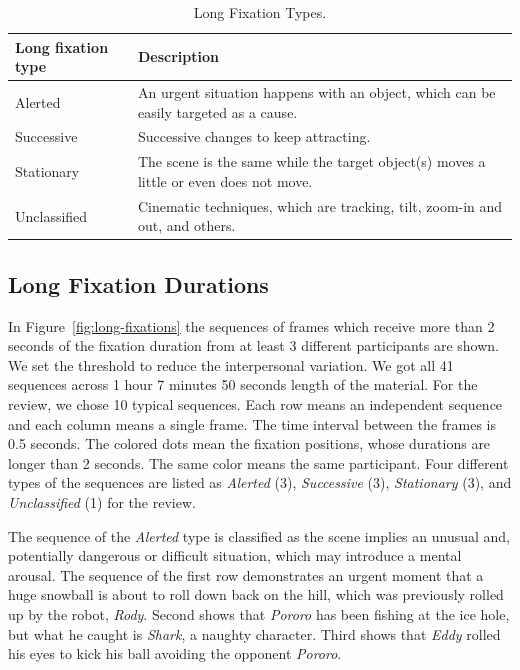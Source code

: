 \documentclass[10pt,letterpaper]{article}
\begin{document}
\begin{table}[!ht]
\begin{center} 
\caption{Long Fixation Types.} 
\label{tab:long-fixation-types} 
\vskip 0.12in
\begin{tabular}{ll} 
\hline
Long fixation type    &  Description \\
\hline
Alerted         &   An urgent situation happens with an object, 
                      which can be easily targeted as a cause. \\
Successive      &   Successive changes to keep attracting. \\
Stationary      &   The scene is the same while the target object(s)
                      moves a little or even does not move. \\
Unclassified    &   Cinematic techniques, which are tracking, tilt, 
                      zoom-in and out, and others. \\
\hline
\end{tabular} 
\end{center} 
\end{table}


\subsection{Long Fixation Durations}
\label{subsec:Long-Fixation-Durations}

In Figure~\ref{fig:long-fixations} the sequences of frames which receive more than 2 seconds of the fixation duration from at least 3 different participants are shown. We set the threshold to reduce the interpersonal variation. We got all 41 sequences across 1 hour 7 minutes 50 seconds length of the material. For the review, we chose 10 typical sequences. Each row means an independent sequence and each column means a single frame. The time interval between the frames is 0.5 seconds. The colored dots mean the fixation positions, whose durations are longer than 2 seconds. The same color means the same participant. Four different types of the sequences are listed as \textit{Alerted} (3), \textit{Successive} (3), \textit{Stationary} (3), and \textit{Unclassified} (1) for the review.

The sequence of the \textit{Alerted} type is classified as the scene implies an unusual and, potentially dangerous or difficult situation, which may introduce a mental arousal. The sequence of the first row demonstrates an urgent moment that a huge snowball is about to roll down back on the hill, which was previously rolled up by the robot, \textit{Rody}. Second shows that \textit{Pororo} has been fishing at the ice hole, but what he caught is \textit{Shark}, a naughty character. Third shows that \textit{Eddy} rolled his eyes to kick his ball avoiding the opponent \textit{Pororo}.
\end{document}
